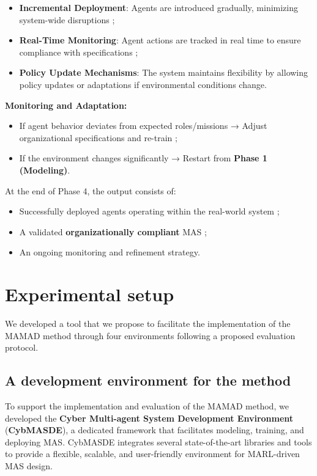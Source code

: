 \documentclass[pdflatex,sn-mathphys-num]{sn-jnl}%
\theoremstyle{thmstyleone}%
\theoremstyle{thmstyletwo}%
\theoremstyle{thmstylethree}%
\begin{document}
\begin{itemize}
    \item \textbf{Incremental Deployment}: Agents are introduced gradually, minimizing system-wide disruptions ;
    \item \textbf{Real-Time Monitoring}: Agent actions are tracked in real time to ensure compliance with specifications ;
    \item \textbf{Policy Update Mechanisms}: The system maintains flexibility by allowing policy updates or adaptations if environmental conditions change.
\end{itemize}

\noindent \textbf{Monitoring and Adaptation:}
\begin{itemize}
    \item If agent behavior deviates from expected roles/missions → Adjust organizational specifications and re-train ;
    \item If the environment changes significantly → Restart from \textbf{Phase 1 (Modeling)}.
\end{itemize}

At the end of Phase 4, the output consists of:
\begin{itemize}
    \item Successfully deployed agents operating within the real-world system ;
    \item A validated \textbf{organizationally compliant} MAS ;
    \item An ongoing monitoring and refinement strategy.
\end{itemize}


\clearpage


\section{Experimental setup}
\label{sec:experimental_setup}

We developed a tool that we propose to facilitate the implementation of the MAMAD method through four environments following a proposed evaluation protocol.

\subsection{A development environment for the method}

To support the implementation and evaluation of the MAMAD method, we developed the \textbf{Cyber Multi-agent System Development Environment} (\textbf{CybMASDE}), a dedicated framework that facilitates modeling, training, and deploying MAS. CybMASDE integrates several state-of-the-art libraries and tools to provide a flexible, scalable, and user-friendly environment for MARL-driven MAS design.
\end{document}
